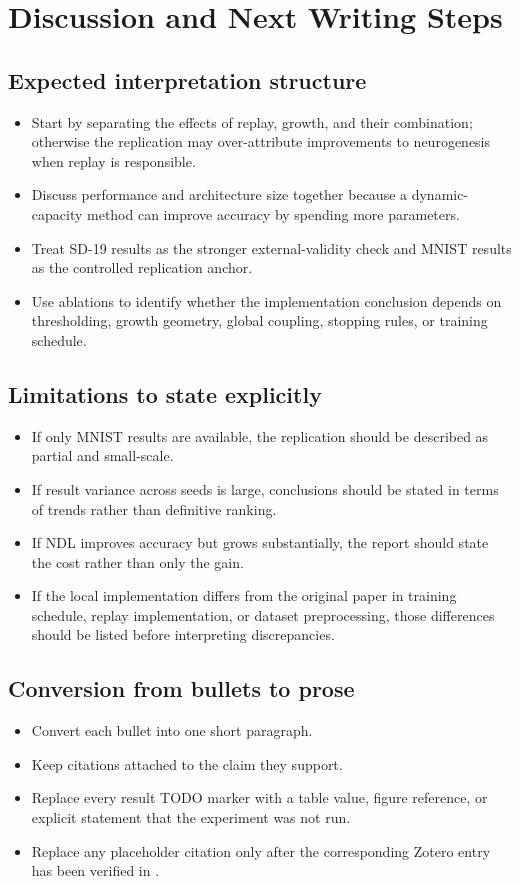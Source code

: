 \section{Discussion and Next Writing Steps}

\subsection{Expected interpretation structure}
\begin{itemize}
  \item Start by separating the effects of replay, growth, and their combination; otherwise the replication may over-attribute improvements to neurogenesis when replay is responsible.
  \item Discuss performance and architecture size together because a dynamic-capacity method can improve accuracy by spending more parameters.
  \item Treat SD-19 results as the stronger external-validity check and MNIST results as the controlled replication anchor.
  \item Use ablations to identify whether the implementation conclusion depends on thresholding, growth geometry, global coupling, stopping rules, or training schedule.
\end{itemize}

\subsection{Limitations to state explicitly}
\begin{itemize}
  \item If only MNIST results are available, the replication should be described as partial and small-scale.
  \item If result variance across seeds is large, conclusions should be stated in terms of trends rather than definitive ranking.
  \item If NDL improves accuracy but grows substantially, the report should state the cost rather than only the gain.
  \item If the local implementation differs from the original paper in training schedule, replay implementation, or dataset preprocessing, those differences should be listed before interpreting discrepancies.
\end{itemize}

\subsection{Conversion from bullets to prose}
\begin{itemize}
  \item Convert each bullet into one short paragraph.
  \item Keep citations attached to the claim they support.
  \item Replace every result TODO marker with a table value, figure reference, or explicit statement that the experiment was not run.
  \item Replace any placeholder citation only after the corresponding Zotero entry has been verified in .
\end{itemize}
